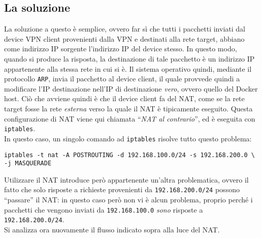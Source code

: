 \subsection{La soluzione}
La soluzione a questo è semplice, ovvero far sì che tutti i pacchetti inviati dal
device VPN client provenienti dalla VPN e destinati alla rete target, abbiano come
indirizzo IP sorgente l'indirizzo IP del device stesso. In questo modo, quando si
produce la risposta, la destinazione di tale pacchetto è un indirizzo IP appartenente
alla stessa rete in cui si è. Il sistema operativo quindi, mediante il protocollo
\texttt{ARP}, invia il pacchetto al device client, il quale provvede quindi a modificare
l'IP destinazione nell'IP di destinazione \textit{vero}, ovvero quello del Docker host.
Ciò che avviene quindi è che il device client fa del NAT, come se la rete target
fosse la rete \textit{esterna} verso la quale il NAT è tipicamente eseguito. Questa
configurazione di NAT viene qui chiamata ``\textit{NAT al contrario}'', ed è eseguita con
\texttt{iptables}.\\
In questo caso, un singolo comando ad \texttt{iptables} risolve tutto questo problema:
\begin{verbatim}
iptables -t nat -A POSTROUTING -d 192.168.100.0/24 -s 192.168.200.0 \
-j MASQUERADE
\end{verbatim}
Utilizzare il NAT introduce però appartenente un'altra problematica, ovvero il fatto che
solo risposte a richieste provenienti da \texttt{192.168.200.0/24} possono ``passare''
il NAT: in questo caso però non vi è alcun problema, proprio perché i pacchetti che
vengono inviati da \texttt{192.168.100.0} \textit{sono} risposte a
\texttt{192.168.200.0/24}.\\
Si analizza ora nuovamente il flusso indicato sopra alla luce del NAT.
